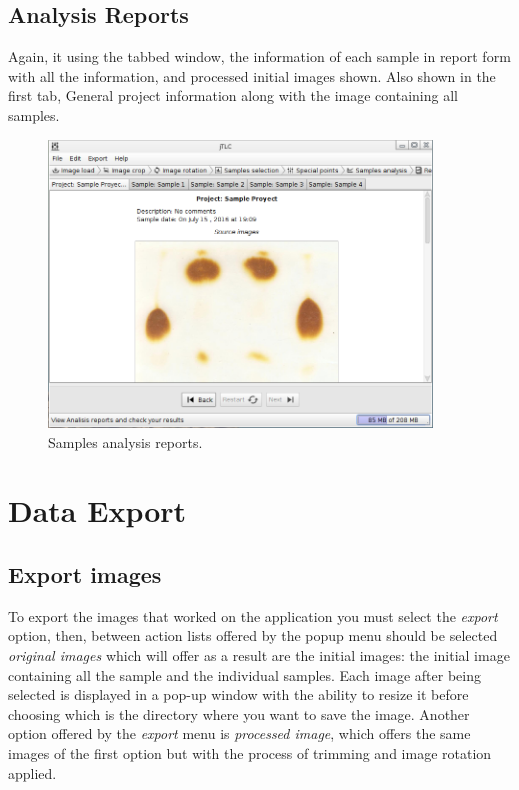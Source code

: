 \section{Analysis Reports}
Again, it using the tabbed window, the information of each sample in report form with all the information, and processed initial images shown. Also shown in the first tab, General project information along with the image containing all samples.
\begin{figure}[H]
	\vspace{0cm}
	\centering
	\includegraphics[width=385px]{imagenes/reports}
	\centering
	\vspace{-0.4cm}
	\caption{Samples analysis reports.}
	\label{fig:image_analysis_reports}
	\vspace{-0.25cm}
\end{figure}

\chapter{Data Export}
\section{Export images}
To export the images that worked on the application you must select the \emph{export} option, then, between action lists offered by the popup menu should be selected \emph{original images} which will offer as a result are the initial images: the initial image containing all the sample and the individual samples. Each image after being selected is displayed in a pop-up window with the ability to resize it before choosing which is the directory where you want to save the image.
Another option offered by the \emph{export} menu is \emph{processed image}, which offers the same images of the first option but with the process of trimming and image rotation applied.
